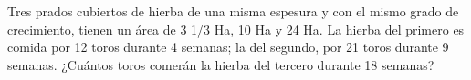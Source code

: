 Tres prados cubiertos de hierba de una misma espesura y con el mismo grado de crecimiento, tienen un área de 3 1/3 Ha, 10 Ha y 24 Ha. La hierba del primero es comida por 12 toros durante 4 semanas; la del segundo, por 21 toros durante 9 semanas. ¿Cuántos toros comerán la hierba del tercero durante 18 semanas?
